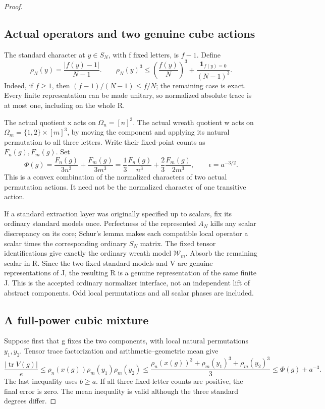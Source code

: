 \begin{proof}
\subsection*{Actual operators and two genuine cube actions}

The standard character at \(y\in S_N\), with f fixed
letters, is \(f-1\).  Define
\[
 \rho_N(y)=\frac{|f(y)-1|}{N-1}.
 \qquad
 \rho_N(y)^3\le\left(\frac{f(y)}N\right)^3
                  +\frac{\mathbf1_{f(y)=0}}{(N-1)^3}.
 \tag{PSC.4}
\]
Indeed, if \(f\ge1\), then
\((f-1)/(N-1)\le f/N\); the remaining case is exact.
Every finite representation can be made unitary, so normalized
absolute trace is at most one, including on the whole R.

The actual quotient x acts on \(\Omega_n=[n]^3\).
The actual wreath quotient w acts on
\(\Omega_m=\{1,2\}\times[m]^3\), by moving the component
and applying its natural permutation to all three letters.
Write their fixed-point counts as \(F_n(g),F_m(g)\).
Set
\[
 \Phi(g)=\frac{F_n(g)}{3n^3}+\frac{F_m(g)}{3m^3}
       =\frac13\frac{F_n(g)}{n^3}
          +\frac23\frac{F_m(g)}{2m^3},
       \qquad \epsilon=a^{-3/2}.
 \tag{PSC.5}
\]
This is a convex combination of the normalized characters of
two actual permutation actions.  It need not be the normalized
character of one transitive action.

If a standard extraction layer was originally specified up to
scalars, fix its ordinary standard models once.  Perfectness
of the represented \(A_N\) kills any scalar discrepancy on
its core; Schur's lemma makes each compatible local operator
a scalar times the corresponding ordinary \(S_N\) matrix.
The fixed tensor identifications give exactly the ordinary
wreath model \(\mathcal W_m\).  Absorb the remaining scalar
in R.  Since the two fixed standard models and V are genuine
representations of J, the resulting R is a genuine
representation of the same finite J.  This is the accepted
ordinary normalizer interface, not an independent lift of
abstract components.  Odd local permutations and all scalar
phases are included.

\subsection*{A full-power cubic mixture}

Suppose first that g fixes the two components, with local
natural permutations \(y_1,y_2\).  Tensor trace factorization
and arithmetic--geometric mean give
\[
 \frac{|\operatorname{tr}V(g)|}{e}
 \le\rho_n(x(g))\rho_m(y_1)\rho_m(y_2)
 \le\frac{\rho_n(x(g))^3+\rho_m(y_1)^3+\rho_m(y_2)^3}{3}
 \le\Phi(g)+a^{-3}.
 \tag{PSC.6}
\]
The last inequality uses \(b\ge a\).  If all three fixed-letter
counts are positive, the final error is zero.  The mean
inequality is valid although the three standard degrees differ.


\end{proof}
